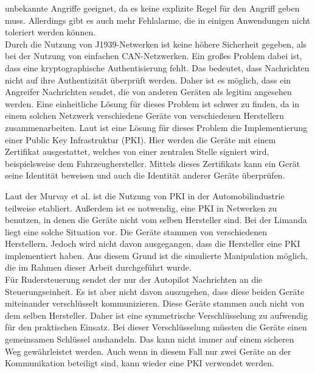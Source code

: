 unbekannte Angriffe geeignet, da es keine explizite Regel für den Angriff geben muss. Allerdings gibt es auch mehr Fehlalarme,
die in einigen Anwendungen nicht toleriert werden können. \\
Durch die Nutzung von J1939-Netwerken ist keine höhere Sicherheit gegeben, als bei der Nutzung von einfachen CAN-Netzwerken. 
Ein großes Problem dabei ist, dass
eine kryptographische Authentisierung fehlt. Das bedeutet, dass Nachrichten nicht auf ihre Authentizität überprüft werden.
Daher ist es möglich, dass ein Angreifer Nachrichten sendet, die von anderen Geräten als legitim angesehen werden.
Eine einheitliche Lösung für dieses Problem ist schwer zu finden, da in einem solchen Netzwerk verschiedene Geräte
von verschiedenen Herstellern zusammenarbeiten. Laut \cite{Murvay2018} ist eine Lösung für dieses Problem die Implementierung einer 
Public Key Infrastruktur (PKI).
Hier werden die Geräte mit einem Zertifikat ausgestattet, welches von einer zentralen Stelle signiert wird, beispielsweise
dem Fahrzeughersteller. Mittels dieses Zertifikats kann ein Gerät seine Identität beweisen und auch die Identität anderer Geräte
überprüfen. 

Laut der Murvay et al. \cite{Murvay2018} ist die Nutzung von PKI in der Automobilindustrie teilweise etabliert. 
Außerdem ist es notwendig, eine PKI in 
Netwerken zu benutzen, in denen die Geräte nicht vom selben Hersteller sind.
Bei der Limanda liegt eine solche Situation vor. Die Geräte stammen von verschiedenen Herstellern. Jedoch wird nicht
davon ausgegangen, dass die Hersteller eine PKI implementiert haben. Aus diesem Grund ist die simulierte Manipulation
möglich, die im Rahmen dieser Arbeit durchgeführt wurde. \\
Für Rudersteuerung sendet der nur der Autopilot Nachrichten an die Steuerungseinheit. Es ist aber nicht davon auszugehen,
dass diese beiden Geräte miteinander verschlüsselt kommunizieren. Diese Geräte stammen auch nicht von dem selben Hersteller.
Daher ist eine symmetrische Verschlüsselung zu aufwendig für den praktischen Einsatz. Bei dieser Verschlüsselung müssten
die Geräte einen gemeinsamen Schlüssel aushandeln. Das kann nicht immer auf einem sicheren Weg gewährleistet werden.
Auch wenn in diesem Fall nur zwei Geräte an der Kommunikation beteiligt sind, kann wieder eine PKI verwendet werden.

